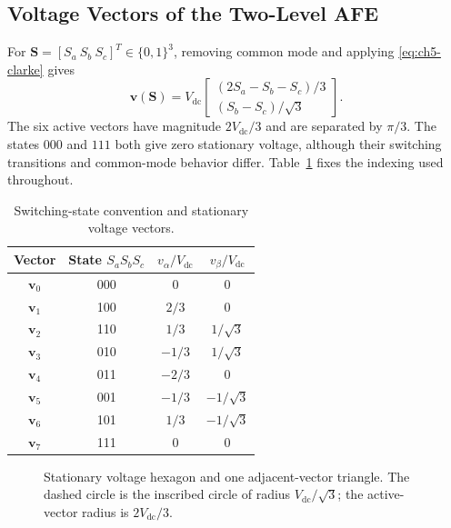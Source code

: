 \subsection{Voltage Vectors of the Two-Level AFE}
For $\mathbf S=[S_a\ S_b\ S_c]^T\in\{0,1\}^3$, removing common mode and applying \eqref{eq:ch5-clarke} gives
\begin{equation}
\mathbf v(\mathbf S)=V_{\mathrm{dc}}\begin{bmatrix}(2S_a-S_b-S_c)/3\\(S_b-S_c)/\sqrt3\end{bmatrix}.
\label{eq:ch5-switching-map}
\end{equation}
The six active vectors have magnitude $2V_{\mathrm{dc}}/3$ and are separated by $\pi/3$. The states $000$ and $111$ both give zero stationary voltage, although their switching transitions and common-mode behavior differ. Table~\ref{tab:ch5-vectors} fixes the indexing used throughout.
\begin{table}[htbp]
\centering
\caption{Switching-state convention and stationary voltage vectors.}
\label{tab:ch5-vectors}
\begin{tabular}{@{}cccc@{}}\toprule
Vector & State $S_aS_bS_c$ & $v_\alpha/V_{\mathrm{dc}}$ & $v_\beta/V_{\mathrm{dc}}$\\\midrule
$\mathbf v_0$ & 000 & 0 & 0\\
$\mathbf v_1$ & 100 & $2/3$ & 0\\
$\mathbf v_2$ & 110 & $1/3$ & $1/\sqrt3$\\
$\mathbf v_3$ & 010 & $-1/3$ & $1/\sqrt3$\\
$\mathbf v_4$ & 011 & $-2/3$ & 0\\
$\mathbf v_5$ & 001 & $-1/3$ & $-1/\sqrt3$\\
$\mathbf v_6$ & 101 & $1/3$ & $-1/\sqrt3$\\
$\mathbf v_7$ & 111 & 0 & 0\\\bottomrule
\end{tabular}
\end{table}

\begin{figure}[htbp]
\centering
{}
\caption{Stationary voltage hexagon and one adjacent-vector triangle. The dashed circle is the inscribed circle of radius $V_{\mathrm{dc}}/\sqrt3$; the active-vector radius is $2V_{\mathrm{dc}}/3$.}
\label{fig:ch5-hexagon}
\end{figure}

